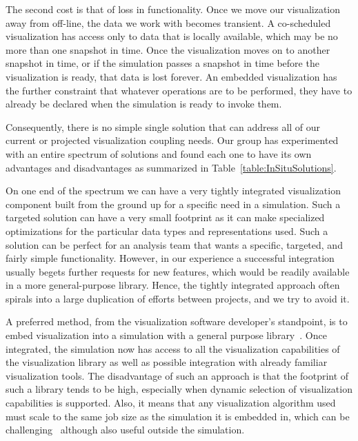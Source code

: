 \documentclass[conference]{IEEEtran}
\newcommand*{\lcite}[1]{~\cite{#1}}
\begin{document}
The second cost is that of loss in functionality.  Once we move our
visualization away from off-line, the data we work with becomes transient.
A co-scheduled visualization has access only to data that is locally
available, which may be no more than one snapshot in time.  Once the
visualization moves on to another snapshot in time, or if the simulation
passes a snapshot in time before the visualization is ready, that data is
lost forever.  An embedded visualization has the further constraint that
whatever operations are to be performed, they have to already be declared
when the simulation is ready to invoke them.

Consequently, there is no simple single solution that can address all of
our current or projected visualization coupling needs.  Our group has
experimented with an entire spectrum of solutions and found each one to
have its own advantages and disadvantages as summarized in
Table~\ref{table:InSituSolutions}.

On one end of the spectrum we can have a very tightly integrated
visualization component built from the ground up for a specific need in a
simulation.  Such a targeted solution can have a very small footprint as it
can make specialized optimizations for the particular data types and
representations used.  Such a solution can be perfect for an analysis team
that wants a specific, targeted, and fairly simple functionality.  However,
in our experience a successful integration usually begets further requests
for new features, which would be readily available in a more
general-purpose library.  Hence, the tightly integrated approach often
spirals into a large duplication of efforts between projects, and we try to
avoid it.

A preferred method, from the visualization software developer's standpoint,
is to embed visualization into a simulation with a general purpose
library\lcite{Fabian2011,VisItLibsim}.  Once integrated, the simulation now
has access to all the visualization capabilities of the visualization
library as well as possible integration with already familiar visualization
tools.  The disadvantage of such an approach is that the footprint of such
a library tends to be high, especially when dynamic selection of
visualization capabilities is supported.  Also, it means that any
visualization algorithm used must scale to the same job size as the
simulation it is embedded in, which can be challenging\lcite{Fabian2012}
although also useful outside the simulation.
\end{document}
